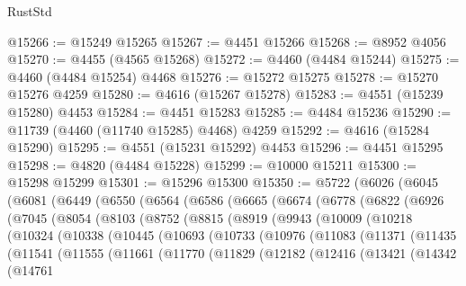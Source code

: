 \begin{lexlean}{RustStd}
\begin{coremodule}
@15266 := @15249 @15265
@15267 := @4451 @15266
@15268 := @8952 @4056
@15270 := @4455 (@4565 @15268)
@15272 := @4460 (@4484 @15244)
@15275 := @4460 (@4484 @15254) @4468
@15276 := @15272 @15275
@15278 := @15270 @15276 @4259
@15280 := @4616 (@15267 @15278)
@15283 := @4551 (@15239 @15280) @4453
@15284 := @4451 @15283
@15285 := @4484 @15236
@15290 := @11739 (@4460 (@11740 @15285) @4468) @4259
@15292 := @4616 (@15284 @15290)
@15295 := @4551 (@15231 @15292) @4453
@15296 := @4451 @15295
@15298 := @4820 (@4484 @15228)
@15299 := @10000 @15211
@15300 := @15298 @15299
@15301 := @15296 @15300
@15350 := @5722
    (@6026
      (@6045
        (@6081
          (@6449
            (@6550
              (@6564
                (@6586
                  (@6665
                    (@6674
                      (@6778
                        (@6822
                          (@6926
                            (@7045
                              (@8054
                                (@8103
                                  (@8752
                                    (@8815
                                      (@8919
                                        (@9943
                                          (@10009
                                            (@10218
                                              (@10324
                                                (@10338
                                                  (@10445
                                                    (@10693
                                                      (@10733
                                                        (@10976
                                                          (@11083
                                                            (@11371
                                                              (@11435
                                                                (@11541
                                                                  (@11555
                                                                    (@11661
                                                                      (@11770
                                                                        (@11829
                                                                          (@12182
                                                                            (@12416
                                                                              (@13421
                                                                                (@14342
                                                                                  (@14761

\end{coremodule}
\end{lexlean}
